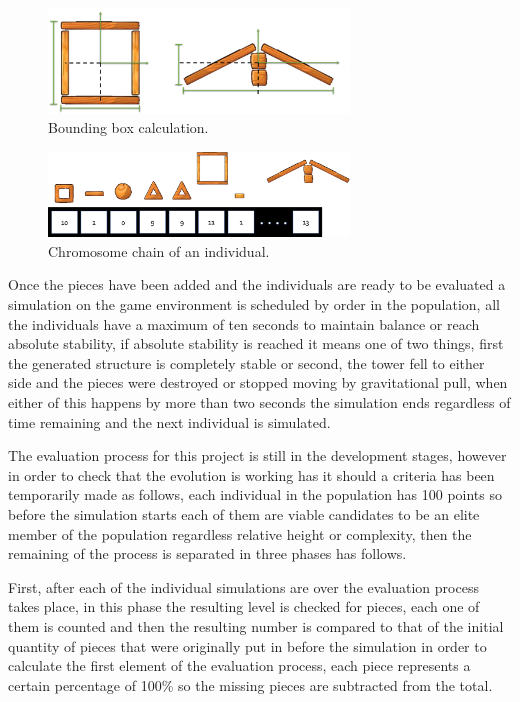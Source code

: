 \documentclass[conference]{IEEEtran}
\begin{document}
\begin{figure}[htbp]
\centerline{\includegraphics[width=80mm]{Images/bounding_box_calculation.png}}
\caption{Bounding box calculation.}
\label{bounding_boc_calc}
\end{figure}

\begin{figure}[htbp]
\centerline{\includegraphics[width=80mm]{Images/chromosome_chain_example.png}}
\caption{Chromosome chain of an individual.}
\label{old_chrom}
\end{figure}

Once the pieces have been added and the individuals are ready to be evaluated a
simulation on the game environment is scheduled by order in the population, all
the individuals have a maximum of ten seconds to maintain balance or reach
absolute stability, if absolute stability is reached it means one of two things,
first the generated structure is completely stable or second, the tower fell to
either side and the pieces were destroyed or stopped moving by gravitational
pull, when either of this happens by more than two seconds the simulation ends
regardless of time remaining and the next individual is simulated.

The evaluation process for this project is still in the development stages,
however in order to check that the evolution is working has it should a criteria
has been temporarily made as follows, each individual in the population has 100
points so before the simulation starts each of them are viable candidates to be
an elite member of the population regardless relative height or complexity, then
the remaining of the process is separated in three phases has follows.

First, after each of the individual simulations are over the evaluation process
takes place, in this phase the resulting level is checked for pieces, each one
of them is counted and then the resulting number is compared to that of the
initial quantity of pieces that were originally put in before the simulation in
order to calculate the first element of the evaluation process, each piece
represents a certain percentage of 100\% so the missing pieces are subtracted
from the total.
\end{document}

